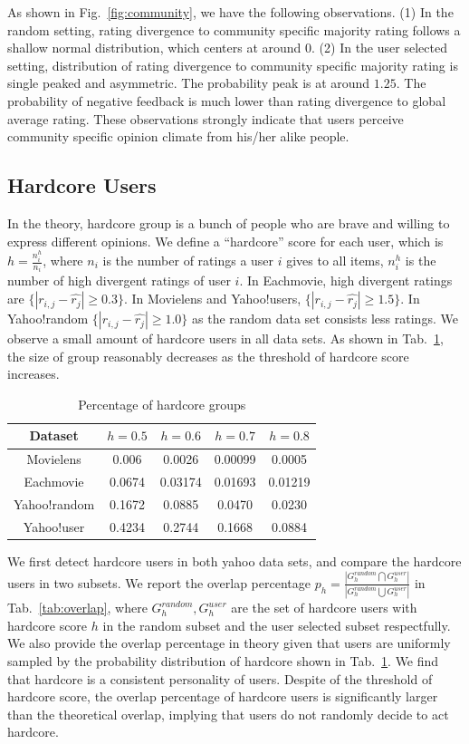 \documentclass[sigconf]{acmart}
\begin{document}
As shown in Fig.~\ref{fig:community}, we have the following observations. (1) In the random setting, rating divergence to community specific majority rating follows a shallow normal distribution, which centers at around $0$.  (2) In the user selected setting, distribution of rating divergence to community specific majority rating is single peaked and asymmetric. The probability peak is at around $1.25$. The probability of negative feedback is much lower than rating divergence to global average rating. These observations strongly indicate that users perceive community specific opinion climate from his/her alike people.

\subsection{Hardcore Users}

In the theory, hardcore group is a bunch of people who are brave and willing to express different opinions. We define a ``hardcore'' score for each user, which is $h=\frac{n^h_i}{n_i}$, where $n_i$ is the number of ratings a user $i$ gives to all items, $n^h_i$ is the number of high divergent ratings of user $i$. In Eachmovie, high divergent ratings are $\{|r_{i,j}-\hat{r_{j}}|\geq 0.3\}$. In Movielens and Yahoo!users, $\{|r_{i,j}-\hat{r_{j}}|\geq 1.5\}$. In Yahoo!random $\{|r_{i,j}-\hat{r_{j}}|\geq 1.0\}$ as the random data set consists less ratings. We observe a small amount of hardcore users in all data sets. As shown in Tab.~\ref{tab:hardcore}, the size of group reasonably decreases as the threshold of hardcore score increases.

\begin{table}[htbp]
\centering
\caption{Percentage of hardcore groups}\label{tab:hardcore}
\centering
\begin{tabular}{|c|c|c|c|c|}
\hline
Dataset & $h=0.5$ & $h=0.6$ & $h=0.7$ & $h=0.8$ \\\hline\hline
Movielens & 0.006	 & 0.0026 &	0.00099 &	0.0005 \\\hline
Eachmovie & 0.0674 &	0.03174 &	0.01693 &	0.01219\\\hline
Yahoo!random & 0.1672& 0.0885& 0.0470& 0.0230\\\hline
Yahoo!user & 0.4234 &0.2744 & 0.1668 & 0.0884\\\hline
\end{tabular}
\end{table}

We first detect hardcore users in both yahoo data sets, and compare the hardcore users in two subsets. We report the overlap percentage $p_h=\frac{|G_{h}^{random}\bigcap G_{h}^{user}|}{|G_{h}^{random}\bigcup G_{h}^{user}|}$ in Tab.~\ref{tab:overlap}, where $G_{h}^{random},G_{h}^{user}$ are the set of hardcore users with hardcore score $h$ in the random subset and the user selected subset respectfully. We also provide the overlap percentage in theory given that users are uniformly sampled by the probability distribution of hardcore shown in Tab.~\ref{tab:hardcore}. We find that hardcore is a consistent personality of users. Despite of the threshold of hardcore score, the overlap percentage of hardcore users is significantly larger than the theoretical overlap, implying that users do not randomly decide to act hardcore.
\end{document}
